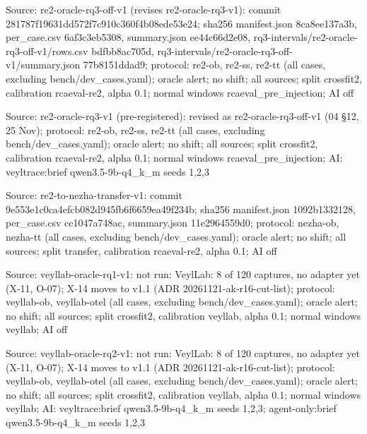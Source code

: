 \noindent Source: re2-oracle-rq3-off-v1 (revises re2-oracle-rq3-v1): commit 281787f19631dd572f7c910c360f4b08ede53e24; sha256 manifest.json 8ca8ee137a3b, per\_case.csv 6af3c3eb5308, summary.json ee44c66d2e08, rq3-intervals/\allowbreak{}re2-oracle-rq3-off-v1/\allowbreak{}rows.csv bdfbb8ac705d, rq3-intervals/\allowbreak{}re2-oracle-rq3-off-v1/\allowbreak{}summary.json 77b8151ddad9; protocol: re2-ob, re2-ss, re2-tt (all cases, excluding bench/\allowbreak{}dev\_cases.yaml); oracle alert; no shift; all sources; split crossfit2, calibration rcaeval-re2, alpha 0.1; normal windows rcaeval\_pre\_injection; AI off\par
\noindent Source: re2-oracle-rq3-v1 (pre-registered): revised as re2-oracle-rq3-off-v1 (04 \S{}12, 25 Nov); protocol: re2-ob, re2-ss, re2-tt (all cases, excluding bench/\allowbreak{}dev\_cases.yaml); oracle alert; no shift; all sources; split crossfit2, calibration rcaeval-re2, alpha 0.1; normal windows rcaeval\_pre\_injection; AI: veyltrace:brief qwen3.5-9b-q4\_k\_m seeds 1,2,3\par
\noindent Source: re2-to-nezha-transfer-v1: commit 9e553e1c0ca4efcb082d945fb6f6659ea49f234b; sha256 manifest.json 1092b1332128, per\_case.csv cc1047a748ac, summary.json 11e2964559d0; protocol: nezha-ob, nezha-tt (all cases, excluding bench/\allowbreak{}dev\_cases.yaml); oracle alert; no shift; all sources; split transfer, calibration rcaeval-re2, alpha 0.1; AI off\par
\noindent Source: veyllab-oracle-rq1-v1: not run: VeylLab: 8 of 120 captures, no adapter yet (X-11, O-07); X-14 moves to v1.1 (ADR 20261121-ak-r16-cut-list); protocol: veyllab-ob, veyllab-otel (all cases, excluding bench/\allowbreak{}dev\_cases.yaml); oracle alert; no shift; all sources; split crossfit2, calibration veyllab, alpha 0.1; normal windows veyllab; AI off\par
\noindent Source: veyllab-oracle-rq2-v1: not run: VeylLab: 8 of 120 captures, no adapter yet (X-11, O-07); X-14 moves to v1.1 (ADR 20261121-ak-r16-cut-list); protocol: veyllab-ob, veyllab-otel (all cases, excluding bench/\allowbreak{}dev\_cases.yaml); oracle alert; no shift; all sources; split crossfit2, calibration veyllab, alpha 0.1; normal windows veyllab; AI: veyltrace:brief qwen3.5-9b-q4\_k\_m seeds 1,2,3; agent-only:brief qwen3.5-9b-q4\_k\_m seeds 1,2,3\par
